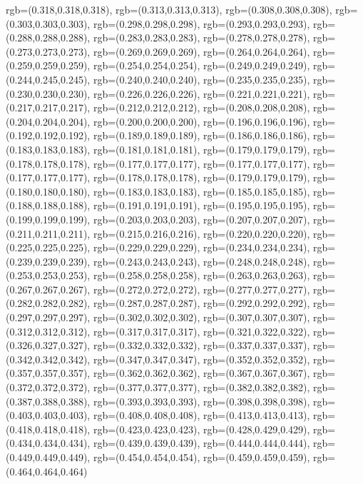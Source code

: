 {{        rgb=(0.318,0.318,0.318),
        rgb=(0.313,0.313,0.313),
        rgb=(0.308,0.308,0.308),
        rgb=(0.303,0.303,0.303),
        rgb=(0.298,0.298,0.298),
        rgb=(0.293,0.293,0.293),
        rgb=(0.288,0.288,0.288),
        rgb=(0.283,0.283,0.283),
        rgb=(0.278,0.278,0.278),
        rgb=(0.273,0.273,0.273),
        rgb=(0.269,0.269,0.269),
        rgb=(0.264,0.264,0.264),
        rgb=(0.259,0.259,0.259),
        rgb=(0.254,0.254,0.254),
        rgb=(0.249,0.249,0.249),
        rgb=(0.244,0.245,0.245),
        rgb=(0.240,0.240,0.240),
        rgb=(0.235,0.235,0.235),
        rgb=(0.230,0.230,0.230),
        rgb=(0.226,0.226,0.226),
        rgb=(0.221,0.221,0.221),
        rgb=(0.217,0.217,0.217),
        rgb=(0.212,0.212,0.212),
        rgb=(0.208,0.208,0.208),
        rgb=(0.204,0.204,0.204),
        rgb=(0.200,0.200,0.200),
        rgb=(0.196,0.196,0.196),
        rgb=(0.192,0.192,0.192),
        rgb=(0.189,0.189,0.189),
        rgb=(0.186,0.186,0.186),
        rgb=(0.183,0.183,0.183),
        rgb=(0.181,0.181,0.181),
        rgb=(0.179,0.179,0.179),
        rgb=(0.178,0.178,0.178),
        rgb=(0.177,0.177,0.177),
        rgb=(0.177,0.177,0.177),
        rgb=(0.177,0.177,0.177),
        rgb=(0.178,0.178,0.178),
        rgb=(0.179,0.179,0.179),
        rgb=(0.180,0.180,0.180),
        rgb=(0.183,0.183,0.183),
        rgb=(0.185,0.185,0.185),
        rgb=(0.188,0.188,0.188),
        rgb=(0.191,0.191,0.191),
        rgb=(0.195,0.195,0.195),
        rgb=(0.199,0.199,0.199),
        rgb=(0.203,0.203,0.203),
        rgb=(0.207,0.207,0.207),
        rgb=(0.211,0.211,0.211),
        rgb=(0.215,0.216,0.216),
        rgb=(0.220,0.220,0.220),
        rgb=(0.225,0.225,0.225),
        rgb=(0.229,0.229,0.229),
        rgb=(0.234,0.234,0.234),
        rgb=(0.239,0.239,0.239),
        rgb=(0.243,0.243,0.243),
        rgb=(0.248,0.248,0.248),
        rgb=(0.253,0.253,0.253),
        rgb=(0.258,0.258,0.258),
        rgb=(0.263,0.263,0.263),
        rgb=(0.267,0.267,0.267),
        rgb=(0.272,0.272,0.272),
        rgb=(0.277,0.277,0.277),
        rgb=(0.282,0.282,0.282),
        rgb=(0.287,0.287,0.287),
        rgb=(0.292,0.292,0.292),
        rgb=(0.297,0.297,0.297),
        rgb=(0.302,0.302,0.302),
        rgb=(0.307,0.307,0.307),
        rgb=(0.312,0.312,0.312),
        rgb=(0.317,0.317,0.317),
        rgb=(0.321,0.322,0.322),
        rgb=(0.326,0.327,0.327),
        rgb=(0.332,0.332,0.332),
        rgb=(0.337,0.337,0.337),
        rgb=(0.342,0.342,0.342),
        rgb=(0.347,0.347,0.347),
        rgb=(0.352,0.352,0.352),
        rgb=(0.357,0.357,0.357),
        rgb=(0.362,0.362,0.362),
        rgb=(0.367,0.367,0.367),
        rgb=(0.372,0.372,0.372),
        rgb=(0.377,0.377,0.377),
        rgb=(0.382,0.382,0.382),
        rgb=(0.387,0.388,0.388),
        rgb=(0.393,0.393,0.393),
        rgb=(0.398,0.398,0.398),
        rgb=(0.403,0.403,0.403),
        rgb=(0.408,0.408,0.408),
        rgb=(0.413,0.413,0.413),
        rgb=(0.418,0.418,0.418),
        rgb=(0.423,0.423,0.423),
        rgb=(0.428,0.429,0.429),
        rgb=(0.434,0.434,0.434),
        rgb=(0.439,0.439,0.439),
        rgb=(0.444,0.444,0.444),
        rgb=(0.449,0.449,0.449),
        rgb=(0.454,0.454,0.454),
        rgb=(0.459,0.459,0.459),
        rgb=(0.464,0.464,0.464)
    }
}